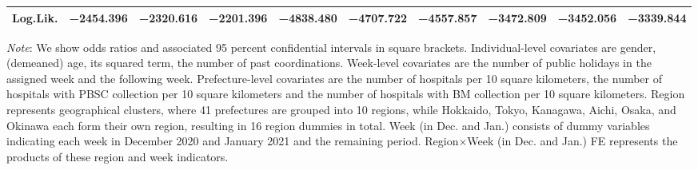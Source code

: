 \documentclass[12pt, a4paper]{article}
\begin{document}
\begin{landscape}
\begin{table}[H]
\begin{threeparttable}
\begin{tabular}[t]{lccccccccc}
Log.Lik. & \num{-2454.396} & \num{-2320.616} & \num{-2201.396} & \num{-4838.480} & \num{-4707.722} & \num{-4557.857} & \num{-3472.809} & \num{-3452.056} & \num{-3339.844}\\
\bottomrule
\end{tabular}
\begin{tablenotes}
\item \emph{Note}: We show odds ratios and associated 95 percent confidential intervals in square brackets. Individual-level covariates are gender, (demeaned) age, its squared term, the number of past coordinations. Week-level covariates are the number of public holidays in the assigned week and the following week. Prefecture-level covariates are the number of hospitals per 10 square kilometers, the number of hospitals with PBSC collection per 10 square kilometers and the number of hospitals with BM collection per 10 square kilometers. Region represents geographical clusters, where 41 prefectures are grouped into 10 regions, while Hokkaido, Tokyo, Kanagawa, Aichi, Osaka, and Okinawa each form their own region, resulting in 16 region dummies in total. Week (in Dec. and Jan.) consists of dummy variables indicating each week in December 2020 and January 2021 and the remaining period. Region$\times$Week (in Dec. and Jan.) FE represents the products of these region and week indicators.
\end{tablenotes}
\end{threeparttable}
\end{table}
\end{landscape}
\end{document}
